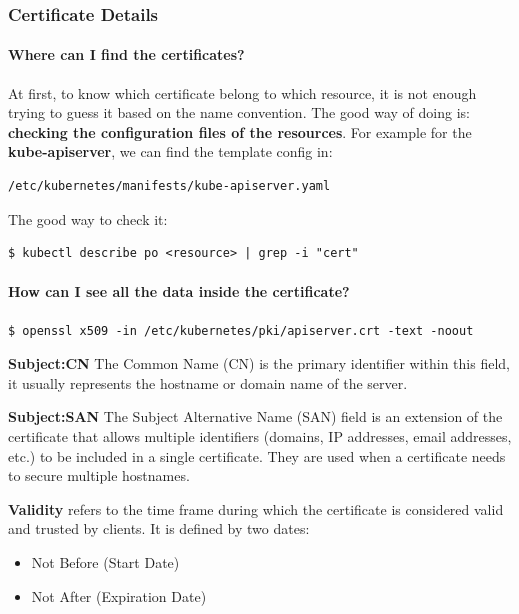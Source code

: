 \documentclass{article}
\newenvironment{codetemplate}[1][]{%
  \mybasecolorbox[#1]
  \itshape
}{%
  \endmybasecolorbox
}
\begin{document}
\subsubsection{Certificate Details}
\paragraph{Where can I find the certificates?}
At first, to know which certificate belong to which resource, it is not enough trying to guess it based on the name convention. The good way of doing is: \textbf{checking the configuration files of the resources}. 
For example for the \textbf{kube-apiserver}, we can find the template config in: 
\begin{codetemplate}{}
\begin{verbatim}
/etc/kubernetes/manifests/kube-apiserver.yaml
\end{verbatim}
\end{codetemplate}

The good way to check it:
\begin{codetemplate}{}
\begin{verbatim}
$ kubectl describe po <resource> | grep -i "cert" 
\end{verbatim}
\end{codetemplate}

\paragraph{How can I see all the data inside the certificate?}
\begin{codetemplate}{}
\begin{verbatim}
$ openssl x509 -in /etc/kubernetes/pki/apiserver.crt -text -noout
\end{verbatim}
\end{codetemplate}

\textbf{Subject:CN} The Common Name (CN) is the primary identifier within this field, it usually represents the hostname or domain name of the server.

\textbf{Subject:SAN} The Subject Alternative Name (SAN) field is an extension of the certificate that allows multiple identifiers (domains, IP addresses, email addresses, etc.) to be included in a single certificate. They are used when a certificate needs to secure multiple hostnames. 

\textbf{Validity}  refers to the time frame during which the certificate is considered valid and trusted by clients. It is defined by two dates:
\begin{itemize}
    \item Not Before (Start Date)
    \item Not After (Expiration Date)
\end{itemize}
\end{document}
